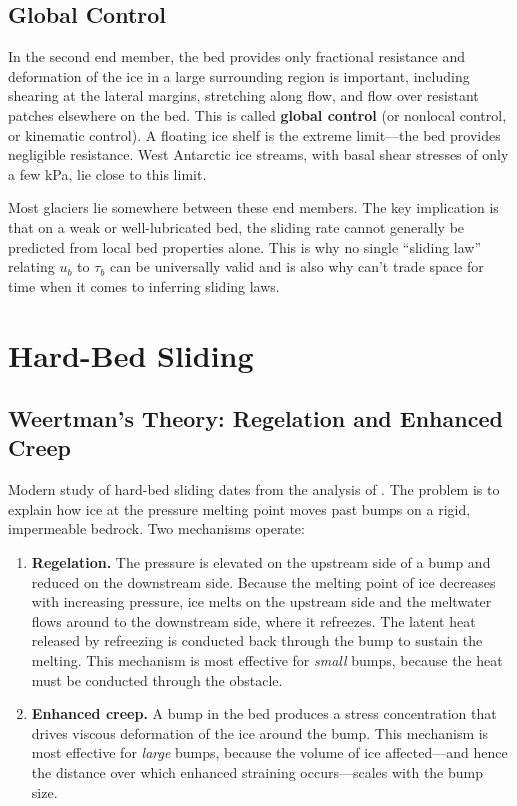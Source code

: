 \documentclass[11pt]{article}
\begin{document}
\subsection{Global Control}

In the second end member, the bed provides only fractional resistance and deformation of the ice in a large surrounding region is important, including shearing at the lateral margins, stretching along flow, and flow over resistant patches elsewhere on the bed.  This is called \textbf{global control} (or nonlocal control, or kinematic control).  A floating ice shelf is the extreme limit---the bed provides negligible resistance.  West Antarctic ice streams, with basal shear stresses of only a few kPa, lie close to this limit.

\medskip
\noindent Most glaciers lie somewhere between these end members.  The key implication is that on a weak or well-lubricated bed, the sliding rate cannot generally be predicted from local bed properties alone.  This is why no single ``sliding law'' relating $u_b$ to $\tau_b$ can be universally valid and is also why can't trade space for time when it comes to inferring sliding laws.

\section{Hard-Bed Sliding}
\label{sec:hard_bed}

\subsection{Weertman's Theory: Regelation and Enhanced Creep}
\label{sec:weertman}

Modern study of hard-bed sliding dates from the analysis of \cite{Weertman1957sliding}.  The problem is to explain how ice at the pressure melting point moves past bumps on a rigid, impermeable bedrock.  Two mechanisms operate:

\begin{enumerate}
  \item \textbf{Regelation.}  The pressure is elevated on the upstream side of a bump and reduced on the downstream side.  Because the melting point of ice decreases with increasing pressure, ice melts on the upstream side and the meltwater flows around to the downstream side, where it refreezes.  The latent heat released by refreezing is conducted back through the bump to sustain the melting.  This mechanism is most effective for \textit{small} bumps, because the heat must be conducted through the obstacle.

  \item \textbf{Enhanced creep.}  A bump in the bed produces a stress concentration that drives viscous deformation of the ice around the bump.  This mechanism is most effective for \textit{large} bumps, because the volume of ice affected---and hence the distance over which enhanced straining occurs---scales with the bump size.
\end{enumerate}
\end{document}
